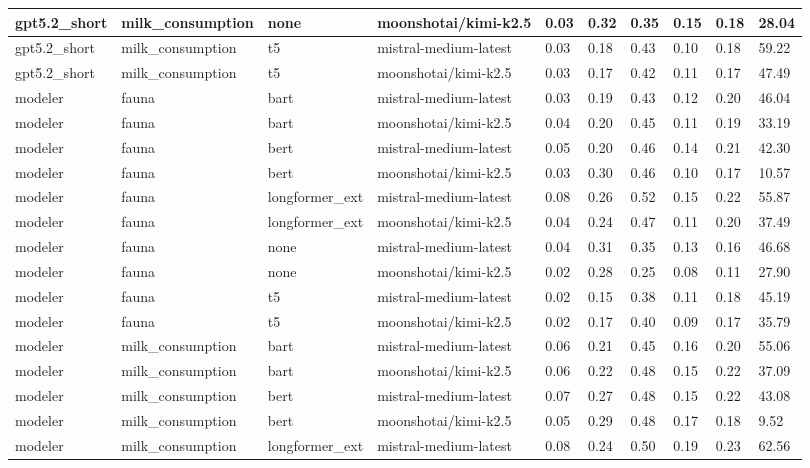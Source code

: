 \begin{tabular}{|l|l|l|l|l|l|l|l|l|l|}
 \hline
 gpt5.2\_short & milk\_consumption & none & moonshotai/kimi-k2.5 & 0.03 & 0.32 & 0.35 & 0.15 & 0.18 & 28.04 \\
 \hline
 gpt5.2\_short & milk\_consumption & t5 & mistral-medium-latest & 0.03 & 0.18 & 0.43 & 0.10 & 0.18 & 59.22 \\
 \hline
 gpt5.2\_short & milk\_consumption & t5 & moonshotai/kimi-k2.5 & 0.03 & 0.17 & 0.42 & 0.11 & 0.17 & 47.49 \\
 \hline
 modeler & fauna & bart & mistral-medium-latest & 0.03 & 0.19 & 0.43 & 0.12 & 0.20 & 46.04 \\
 \hline
 modeler & fauna & bart & moonshotai/kimi-k2.5 & 0.04 & 0.20 & 0.45 & 0.11 & 0.19 & 33.19 \\
 \hline
 modeler & fauna & bert & mistral-medium-latest & 0.05 & 0.20 & 0.46 & 0.14 & 0.21 & 42.30 \\
 \hline
 modeler & fauna & bert & moonshotai/kimi-k2.5 & 0.03 & 0.30 & 0.46 & 0.10 & 0.17 & 10.57 \\
 \hline
 modeler & fauna & longformer\_ext & mistral-medium-latest & 0.08 & 0.26 & 0.52 & 0.15 & 0.22 & 55.87 \\
 \hline
 modeler & fauna & longformer\_ext & moonshotai/kimi-k2.5 & 0.04 & 0.24 & 0.47 & 0.11 & 0.20 & 37.49 \\
 \hline
 modeler & fauna & none & mistral-medium-latest & 0.04 & 0.31 & 0.35 & 0.13 & 0.16 & 46.68 \\
 \hline
 modeler & fauna & none & moonshotai/kimi-k2.5 & 0.02 & 0.28 & 0.25 & 0.08 & 0.11 & 27.90 \\
 \hline
 modeler & fauna & t5 & mistral-medium-latest & 0.02 & 0.15 & 0.38 & 0.11 & 0.18 & 45.19 \\
 \hline
 modeler & fauna & t5 & moonshotai/kimi-k2.5 & 0.02 & 0.17 & 0.40 & 0.09 & 0.17 & 35.79 \\
 \hline
 modeler & milk\_consumption & bart & mistral-medium-latest & 0.06 & 0.21 & 0.45 & 0.16 & 0.20 & 55.06 \\
 \hline
 modeler & milk\_consumption & bart & moonshotai/kimi-k2.5 & 0.06 & 0.22 & 0.48 & 0.15 & 0.22 & 37.09 \\
 \hline
 modeler & milk\_consumption & bert & mistral-medium-latest & 0.07 & 0.27 & 0.48 & 0.15 & 0.22 & 43.08 \\
 \hline
 modeler & milk\_consumption & bert & moonshotai/kimi-k2.5 & 0.05 & 0.29 & 0.48 & 0.17 & 0.18 & 9.52 \\
 \hline
 modeler & milk\_consumption & longformer\_ext & mistral-medium-latest & 0.08 & 0.24 & 0.50 & 0.19 & 0.23 & 62.56 \\

\end{tabular}
